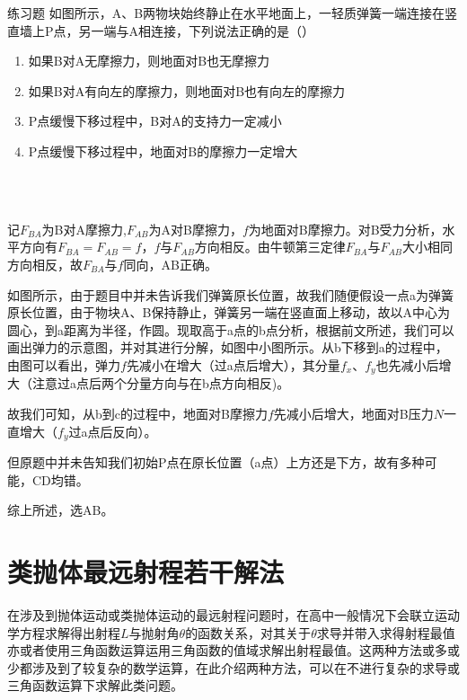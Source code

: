 \begin{ep}{练习题}{}
如图所示，A、B两物块始终静止在水平地面上，一轻质弹簧一端连接在竖直墙上P点，另一端与A相连接，下列说法正确的是（）

\begin{minipage}[b]{0.6\linewidth}
\begin{enumerate}[label=(\Alph*)]
  \item 如果B对A无摩擦力，则地面对B也无摩擦力
  \item 如果B对A有向左的摩擦力，则地面对B也有向左的摩擦力
  \item P点缓慢下移过程中，B对A的支持力一定减小
  \item P点缓慢下移过程中，地面对B的摩擦力一定增大
\end{enumerate}
\end{minipage}
\hfill
\begin{minipage}[b]{0.3\linewidth}

~\\

\end{minipage}
~\\

记$F_{BA}$为B对A摩擦力,$F_{AB}$为A对B摩擦力，$f$为地面对B摩擦力。对B受力分析，水平方向有$F_{BA}=F_{AB}=f$，$f$与$F_{AB}$方向相反。由牛顿第三定律$F_{BA}$与$F_{AB}$大小相同方向相反，故$F_{BA}$与$f$同向，AB正确。



如图所示，由于题目中并未告诉我们弹簧原长位置，故我们随便假设一点a为弹簧原长位置，由于物块A、B保持静止，弹簧另一端在竖直面上移动，故以A中心为圆心，到a距离为半径，作圆。现取高于a点的b点分析，根据前文所述，我们可以画出弹力的示意图，并对其进行分解，如图中小图所示。从b下移到a的过程中，由图可以看出，弹力$f$先减小在增大（过a点后增大），其分量$f_x$、$f_y$也先减小后增大（注意过a点后两个分量方向与在b点方向相反)。


故我们可知，从b到c的过程中，地面对B摩擦力$f$先减小后增大，地面对B压力$N$一直增大（$f_y$过a点后反向）。


但原题中并未告知我们初始P点在原长位置（a点）上方还是下方，故有多种可能，CD均错。


综上所述，选AB。
\end{ep}

\section{类抛体最远射程若干解法}

在涉及到抛体运动或类抛体运动的最远射程问题时，在高中一般情况下会联立运动学方程求解得出射程$L$与抛射角$\theta$的函数关系，对其关于$\theta$求导并带入求得射程最值亦或者使用三角函数运算运用三角函数的值域求解出射程最值。这两种方法或多或少都涉及到了较复杂的数学运算，在此介绍两种方法，可以在不进行复杂的求导或三角函数运算下求解此类问题。


